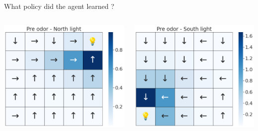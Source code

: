 \documentclass[bigger]{beamer}
\begin{document}
\begin{frame}[label={sec:org2230165}]{What policy did the agent learned ?}
\vspace{-7em}
\begin{columns}
\begin{column}[t]{0.5\columnwidth}
\begin{center}
\includegraphics[height=0.4\textheight]{img/policy-allo-north-light.png}
\end{center}
\end{column}
\begin{column}[t]{0.5\columnwidth}
\begin{center}
\includegraphics[height=0.4\textheight]{img/policy-allo-south-light.png}
\end{center}
\end{column}
\end{columns}
\end{frame}
\end{document}
